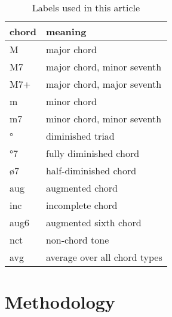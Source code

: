\documentclass{article}
\begin{document}
\begin{table}
\centering
\begin{tabular}{l|l}
chord & meaning \\ \hline
    M & major chord \\
   M7 & major chord, minor seventh \\
  M7+ & major chord, major seventh \\
    m & minor chord \\
   m7 & minor chord, minor seventh \\
    ° & diminished triad \\
   °7 & fully diminished chord \\
   ø7 & half-diminished chord \\
  aug & augmented chord \\
  inc & incomplete chord \\
 aug6 & augmented sixth chord \\
  nct & non-chord tone \\
  avg & average over all chord types \\
\end{tabular}
\caption{Labels used in this article}
\label{tab:legenda}
\end{table}

\section{Methodology}
\label{sec:methodology}
\end{document}
